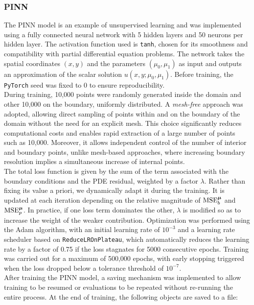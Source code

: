 \documentclass[
    conference,
    nofonttune,
    11pt
]{IEEEtran}
\begin{document}
            \subsubsection{PINN}
            
                The PINN model is an example of unsupervised learning and was implemented using a fully connected neural network with 5 hidden layers and 50 neurons per hidden layer. The activation function used is \texttt{tanh}, chosen for its smoothness and compatibility with partial differential equation problems. The network takes the spatial coordinates $(x, y)$ and the parameters $(\mu_0,\mu_1)$ as input and outputs an approximation of the scalar solution $u(x, y; \mu_0,\mu_1)$. Before training, the \texttt{PyTorch} seed was fixed to 0 to ensure reproducibility.\\
                During training, 10,000 points were randomly generated inside the domain and other 10,000 on the boundary, uniformly distributed. A \textit{mesh-free} approach was adopted, allowing direct sampling of points within and on the boundary of the domain without the need for an explicit mesh. This choice significantly reduces computational costs and enables rapid extraction of a large number of points such as 10,000. Moreover, it allows independent control of the number of interior and boundary points, unlike mesh-based approaches, where increasing boundary resolution implies a simultaneous increase of internal points.\\   
                The total loss function is given by the sum of the term associated with the boundary conditions and the PDE residual, weighted by a factor $\lambda $. Rather than fixing its value a priori, we dynamically adapt it during the training. It is updated at each iteration depending on the relative magnitude of $\operatorname{MSE}^{\boldsymbol\mu}_b$ and $\operatorname{MSE}^{\boldsymbol\mu}_p$. In practice, if one loss term dominates the other, $\lambda$ is modified so as to increase the weight of the weaker contribution. Optimization was performed using the Adam algorithm, with an initial learning rate of $10^{-3}$ and a learning rate scheduler based on \texttt{ReduceLROnPlateau}, which automatically reduces the learning rate by a factor of 0.75 if the loss stagnates for 5000 consecutive epochs. Training was carried out for a maximum of 500,000 epochs, with early stopping triggered when the loss dropped below a tolerance threshold of $10^{-7}$.\\
                After training the PINN model, a saving mechanism was implemented to allow training to be resumed or evaluations to be repeated without re-running the entire process. At the end of training, the following objects are saved to a file:
                
\end{document}
